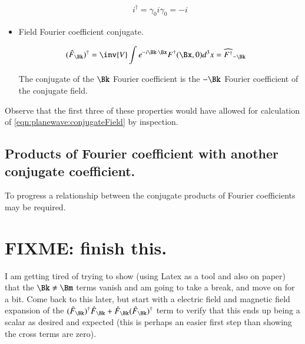\begin{itemize}
\begin{align}
i^\dagger = \gamma_{0} i \gamma_0 = -i
\end{align}

\item Field Fourier coefficient conjugate.

\begin{align}
(\hat{F}_{\Bk})^\dagger 
&=
\inv{V} \int e^{-i \Bk \cdot \Bx } F^\dagger(\Bx,0) d^3x = \widehat{F^\dagger}_{-\Bk}
\end{align}

The conjugate of the $\Bk$ Fourier coefficient is the $-\Bk$ Fourier coefficient of the conjugate field.

\end{itemize}

Observe that the first three of these properties would have allowed for calculation of 
\ref{eqn:planewave:conjugateField} by inspection.

\subsection{Products of Fourier coefficient with another conjugate coefficient. }

To progress a relationship between the conjugate products of Fourier coefficients may be required.

\section{FIXME: finish this. }

I am getting tired of trying to show (using Latex as a tool and also on paper)
that the $\Bk \ne \Bm$ terms vanish and am going to take a break, and move on for a bit.  Come back to this later, but start
with a electric field and magnetic field expansion of the $
(\hat{F}_\Bk)^\dagger \hat{F}_\Bk
+
\hat{F}_\Bk (\hat{F}_\Bk)^\dagger 
$ term to verify that this ends up being a scalar as desired and expected
(this is perhaps an easier first step than showing the cross terms are zero).
